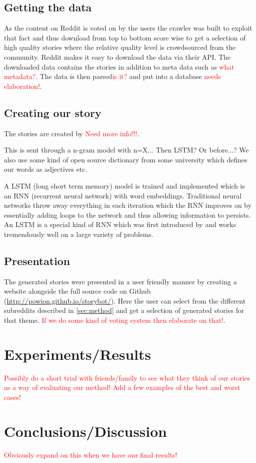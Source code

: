 \documentclass[12pt,a4paper,utf8]{article}
\newcommand\todonote[1]{\textcolor{red}{#1}}
\begin{document}
\subsection{Getting the data}
As the content on Reddit is voted on by the users the crawler was built to exploit that fact and thus download from top to bottom score wise to get a selection of high quality stories where the relative quality level is crowdsourced from the community. Reddit makes it easy to download the data via their API\autocite{redditAPI}. The downloaded data contains the stories in addition to meta data such as \todonote{what metadata?}. The data is then parsed\todonote{is it?} and put into a database \todonote{needs elaboration!}.

\subsection{Creating our story}
The stories are created by \todonote{Need more info!!!}.

This is sent through a n-gram model with n=X... Then LSTM? Or before...? We also use some kind of open source dictionary from some university which defines our words as adjectives etc.

A LSTM (long short term memory) model is trained and implemented which is an RNN (recurrent neural network) with word embeddings. Traditional neural networks throw away everything in each iteration which the RNN improves on by essentially adding loops to the network and thus allowing information to persists\autocite{LSTM}. An LSTM is a special kind of RNN which was first introduced by \textcite{LSTMarticle} and works tremendously well on a large variety of problems\autocite{LSTM}.

\subsection{Presentation}
The generated stories were presented in a user friendly manner by creating a website alongside the full source code on Github (\url{http://powion.github.io/storybot/}). Here the user can select from the different subreddits described in \autoref{sec:method} and get a selection of generated stories for that theme. \todonote{If we do some kind of voting system then elaborate on that!}.

\section{Experiments/Results}
\lipsum[2] \todonote{Possibly do a short trial with friends/family to see what they think of our stories as a way of evaluating our method!} \todonote{Add a few examples of the best and worst cases!}

\section{Conclusions/Discussion}
\lipsum[3]
\todonote{Obviously expand on this when we have our final results!}

\printbibliography[heading=bibnumbered]
\end{document}

